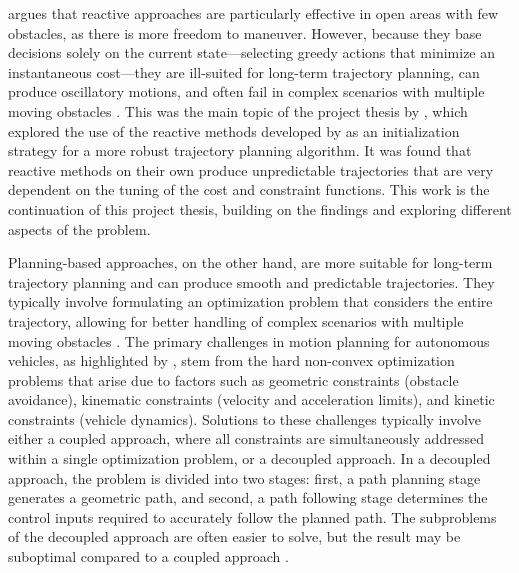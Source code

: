 \citet{Wang2019} argues that reactive approaches are particularly effective in open areas with few obstacles, as there is more freedom to maneuver.
However, because they base decisions solely on the current state---selecting greedy actions that minimize an instantaneous cost---they are ill-suited for long-term trajectory planning, can produce oscillatory motions, and often fail in complex scenarios with multiple moving obstacles \citep{Liu2024-VO-Traj}. This was the main topic of the project thesis by \cite{prosjektoppgave}, which explored the use of the reactive methods developed by \citet{Thyri2022-VO} as an initialization strategy for a more robust trajectory planning algorithm. It was found that reactive methods on their own produce unpredictable trajectories that are very dependent on the tuning of the cost and constraint functions. This work is the continuation of this project thesis, building on the findings and exploring different aspects of the problem.

Planning-based approaches, on the other hand, are more suitable for long-term trajectory planning and can produce smooth and predictable trajectories. They typically involve formulating an optimization problem that considers the entire trajectory, allowing for better handling of complex scenarios with multiple moving obstacles \citep{Liu2024-VO-Traj}.
The primary challenges in motion planning for autonomous vehicles, as highlighted by \citet{mercy2016spline}, stem from the hard non-convex optimization problems that arise due to factors such as geometric constraints (obstacle avoidance), kinematic constraints (velocity and acceleration limits), and kinetic constraints (vehicle dynamics). Solutions to these challenges typically involve either a coupled approach, where all constraints are simultaneously addressed within a single optimization problem, or a decoupled approach. In a decoupled approach, the problem is divided into two stages: first, a path planning stage generates a geometric path, and second, a path following stage determines the control inputs required to accurately follow the planned path. The subproblems of the decoupled approach are often easier to solve, but the result may be suboptimal compared to a coupled approach \citep{mercy2016spline}.

